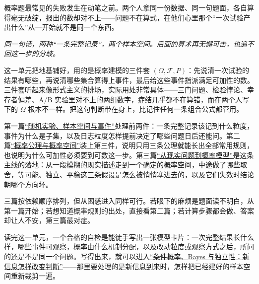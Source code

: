 概率题最常见的失败发生在动笔之前。两个人拿同一份数据、同一句题面，各自算得毫无破绽，报出的数却对不上——问题不在算式，在他们心里那个``一次试验产出什么''从一开始就不是同一个东西。

\begin{center}

\emph{同一句话，两种``一条完整记录''，两个样本空间。后面的算术再无懈可击，也追不回这一步的分歧。}
\end{center}

这一单元把地基铺好，用的是概率建模的三件套 \((\Omega,\mathcal F,P)\)：先说清一次试验的结果有哪些，再说清哪些集合算得上事件，最后给这些事件指派满足可加性的数。三件套听起来像形式主义的排场，实际用处非常具体——三门问题、检验悖论、幸存者偏差、A/B 实验里对不上的两组数字，症结几乎都不在算错，而在两个人写下的 \(\Omega\) 根本不一样。把这句判断带在身上，比记住任何一条组合公式都管用。

第一篇\hyperref[sec:05-Probability/01-Probability-Spaces/01]{``随机实验、样本空间与事件''}处理前两件：一条完整记录该记到什么粒度，事件为什么是子集，以及日志粒度怎样提前决定了哪些问题日后还能问。第二篇\hyperref[sec:05-Probability/01-Probability-Spaces/02]{``概率公理与概率空间''}装上第三件，说明只用三条公理就能长出全部常用规则，也说明为什么可加性必须要到可数这一步。第三篇\hyperref[sec:05-Probability/01-Probability-Spaces/03]{``从现实问题到概率模型''}是这条主线的落地：从一段模糊的现实描述走到一个确定的概率空间，中途做了哪些取舍，等可能、独立、平稳这三条假设是怎么被悄悄塞进去的，以及它们失效时结论朝哪个方向坏。

三篇按依赖顺序排列，但从困惑进入同样可行。若眼下的麻烦是题面读不明白，从第一篇开始；若想知道概率规则的出处，直接看第二篇；若计算步骤都会做、答案却让人不安，第三篇最对症。

读完这一单元，一个合格的自检是能徒手写出一张模型卡片：一次完整结果长什么样，哪些事件可观察，概率由什么机制分配，以及改动粒度或观察方式之后，所问的还是不是同一个问题。写得出来，就可以进入\hyperref[ch:038]{``条件概率、Bayes 与独立性：新信息怎样改变判断''}——那里要处理的是新信息到来时，怎样把已经建好的样本空间重新裁剪一遍。
